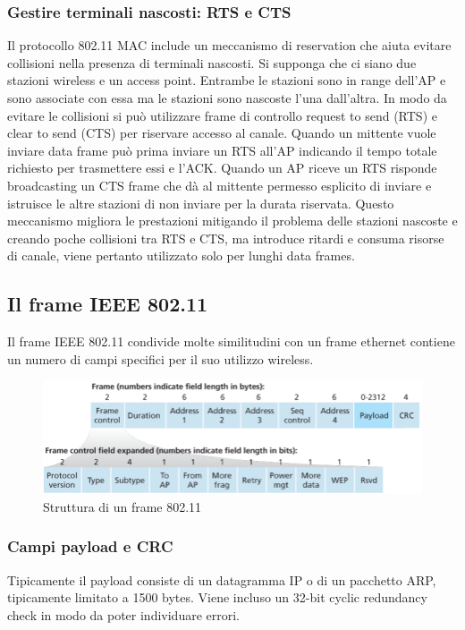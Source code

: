 \subsubsection{Gestire terminali nascosti: RTS e CTS}
Il protocollo 802.11 MAC include un meccanismo di reservation che aiuta evitare collisioni nella presenza di terminali nascosti. Si supponga che ci siano due stazioni wireless e un access point. Entrambe le
stazioni sono in range dell'AP e sono associate con essa ma le stazioni sono nascoste l'una dall'altra. In modo da evitare le collisioni si pu\`o utilizzare frame di controllo request to send (RTS) e clear to send 
(CTS) per riservare accesso al canale. Quando un mittente vuole inviare data frame pu\`o prima inviare un RTS all'AP indicando il tempo totale richiesto per trasmettere essi e l'ACK. Quando un AP riceve un RTS
risponde broadcasting un CTS frame che d\`a al mittente permesso esplicito di inviare e istruisce le altre stazioni di non inviare per la durata riservata. Questo meccanismo migliora le prestazioni mitigando il 
problema delle stazioni nascoste e creando poche collisioni tra RTS e CTS, ma introduce ritardi e consuma risorse di canale, viene pertanto utilizzato solo per lunghi data frames. 
\subsection{Il frame IEEE 802.11}
Il frame IEEE 802.11 condivide molte similitudini con un frame ethernet contiene un numero di campi specifici per il suo utilizzo wireless.
\begin{figure}[h]
\includegraphics[width=\textwidth]{Frame80211.png}
\caption{Struttura di un frame 802.11}
\end{figure}
\subsubsection{Campi payload e CRC}
Tipicamente il payload consiste di un datagramma IP o di un pacchetto ARP, tipicamente limitato a 1500 bytes. Viene incluso un 32-bit cyclic redundancy check in modo da poter individuare errori. 
